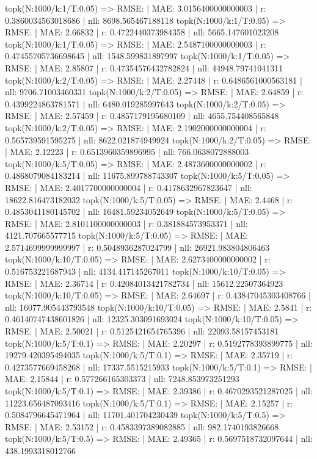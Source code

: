 topk(N:1000/k:1/T:0.05) => RMSE: | MAE: 3.0156400000000003 | r: 0.3860034563018686 | nll: 8698.565467188118
topk(N:1000/k:1/T:0.05) => RMSE: | MAE: 2.66832 | r: 0.4722440373984358 | nll: 5665.147601023208
topk(N:1000/k:1/T:0.05) => RMSE: | MAE: 2.5487100000000003 | r: 0.47455705736698645 | nll: 1548.599831897997
topk(N:1000/k:1/T:0.05) => RMSE: | MAE: 2.85807 | r: 0.47354576432782824 | nll: 44948.79741041311
topk(N:1000/k:2/T:0.05) => RMSE: | MAE: 2.27448 | r: 0.6486561000563181 | nll: 9706.71003460331
topk(N:1000/k:2/T:0.05) => RMSE: | MAE: 2.64859 | r: 0.4399224863781571 | nll: 6480.019285997643
topk(N:1000/k:2/T:0.05) => RMSE: | MAE: 2.57459 | r: 0.4857179195680109 | nll: 4655.754408565848
topk(N:1000/k:2/T:0.05) => RMSE: | MAE: 2.1902000000000004 | r: 0.565739591595275 | nll: 8622.021874949924
topk(N:1000/k:2/T:0.05) => RMSE: | MAE: 2.12223 | r: 0.6513960359896995 | nll: 766.0638072888003
topk(N:1000/k:5/T:0.05) => RMSE: | MAE: 2.4873600000000002 | r: 0.4868079084183214 | nll: 11675.899788743307
topk(N:1000/k:5/T:0.05) => RMSE: | MAE: 2.4017700000000004 | r: 0.4178632967823647 | nll: 18622.816473182032
topk(N:1000/k:5/T:0.05) => RMSE: | MAE: 2.4468 | r: 0.4853041180145702 | nll: 16481.59234052649
topk(N:1000/k:5/T:0.05) => RMSE: | MAE: 2.8101100000000003 | r: 0.381884573953371 | nll: 4121.707665577715
topk(N:1000/k:5/T:0.05) => RMSE: | MAE: 2.5714699999999997 | r: 0.5048936287024799 | nll: 26921.983804806463
topk(N:1000/k:10/T:0.05) => RMSE: | MAE: 2.6273400000000002 | r: 0.516753221687943 | nll: 4134.417145267011
topk(N:1000/k:10/T:0.05) => RMSE: | MAE: 2.36714 | r: 0.42084013421782734 | nll: 15612.22507364923
topk(N:1000/k:10/T:0.05) => RMSE: | MAE: 2.64697 | r: 0.43847045303408766 | nll: 16077.905443793548
topk(N:1000/k:10/T:0.05) => RMSE: | MAE: 2.5841 | r: 0.46140747438601826 | nll: 12325.303091693024
topk(N:1000/k:10/T:0.05) => RMSE: | MAE: 2.50021 | r: 0.5125421654765396 | nll: 22093.58157453181
topk(N:1000/k:5/T:0.1) => RMSE: | MAE: 2.20297 | r: 0.5192778393899775 | nll: 19279.420395494035
topk(N:1000/k:5/T:0.1) => RMSE: | MAE: 2.35719 | r: 0.4273577669458268 | nll: 17337.5515215933
topk(N:1000/k:5/T:0.1) => RMSE: | MAE: 2.15844 | r: 0.577266165303373 | nll: 7248.853973251293
topk(N:1000/k:5/T:0.1) => RMSE: | MAE: 2.39386 | r: 0.4670293521287025 | nll: 11223.656487093416
topk(N:1000/k:5/T:0.1) => RMSE: | MAE: 2.15257 | r: 0.5084796645471964 | nll: 11701.401704230439
topk(N:1000/k:5/T:0.5) => RMSE: | MAE: 2.53152 | r: 0.4583397389082885 | nll: 982.1740193826668
topk(N:1000/k:5/T:0.5) => RMSE: | MAE: 2.49365 | r: 0.5697518732097644 | nll: 438.1993318012766
